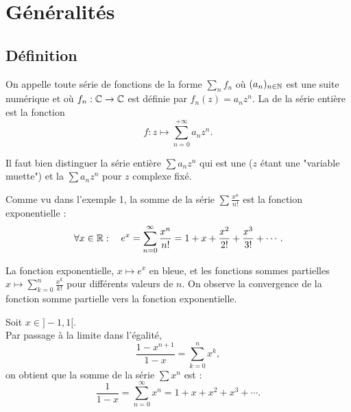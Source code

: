 \documentclass{book}
\begin{document}
\section{Généralités}
\subsection{Définition}
\begin{Definition}

On appelle  toute série de fonctions de la forme $\sum _n f_n$
où $(a_n)_{n\in \mathbb{N}}$ est une suite numérique et
où $f_n:\mathbb{C}\to\mathbb{C}$ est définie par $f_n(z) = a_n z^n$.
La  de la série entière est la fonction \[ f \colon z \mapsto \sum_{n=0}^{+\infty} a_n z^n. \]
\end{Definition}

\begin{Remarque}
Il faut bien distinguer la série entière $\sum a_n z^n$ qui est une  ($z$ étant une "variable
muette") et la  $\sum a_n z^n$ pour $z$ complexe fixé.
\end{Remarque}

\begin{Exemple} 



        \begin{minipage}[c]{0.45\linewidth}{
Comme vu dans l'exemple 1, la somme de la série $\sum \frac {x^{n}}{n!}$ est la fonction exponentielle :
$$\forall x\in \mathbb{R} :\quad e^{x}=\sum _{n=0}^{\infty }{\frac {x^{n}}{n!}}=1+x+{\frac {x^{2}}{2!}}+{\frac {x^{3}}{3!}}+\cdots .$$
}
\end{minipage}
    \begin{minipage}[c]{0.45\linewidth}{
La fonction exponentielle, $x\mapsto e^x$ en bleue, et les fonctions sommes partielles $x\mapsto \sum_{k=0}^{n} \frac{x^k}{k!}$ pour différents valeurs de $n$. On observe la convergence de la fonction somme partielle vers la fonction exponentielle.
}
    \end{minipage}
\end{Exemple}
\begin{Exemple} 
Soit  $x\in ]-1,1[$.\\
Par passage à la limite dans l'égalité,  $$\frac{1-x^{n+1}}{1-x}=\sum _{k=0}^{n }x^k,$$ 
on obtient que la  somme de la série $\sum x^{n}$ est  :
$$\frac{1}{1-x}=\sum _{n=0}^{\infty }x^{n}=1+x+x^2 + x^3+\cdots .$$
\end{Exemple}
\end{document}
